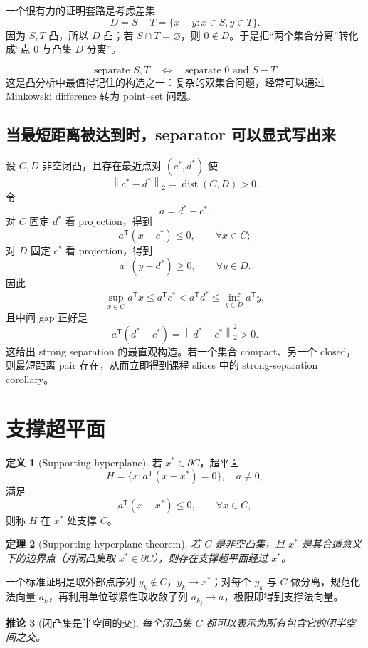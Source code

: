 \documentclass[11pt,a4paper,openany]{ctexrep}
\newtheorem{theorem}{定理}[chapter]
\newtheorem{corollary}[theorem]{推论}
\theoremstyle{definition}
\newtheorem{definition}[theorem]{定义}
\newcommand{\dist}{\operatorname{dist}}
\newcommand{\norm}[1]{\left\lVert #1\right\rVert}
\newcommand{\transpose}{\mathsf{T}}
\begin{document}
一个很有力的证明套路是考虑差集
\[
D=S-T=\{x-y:x\in S,y\in T\}.
\]
因为 $S,T$ 凸，所以 $D$ 凸；若 $S\cap T=\varnothing$，则 $0\notin D$。于是把“两个集合分离”转化成“点 $0$ 与凸集 $D$ 分离”。

\begin{keybox}[差集技巧]
\[
\boxed{\text{separate }S,T\quad\Longleftrightarrow\quad\text{separate }0\text{ and }S-T}
\]
这是凸分析中最值得记住的构造之一：复杂的双集合问题，经常可以通过 Minkowski difference 转为 point--set 问题。
\end{keybox}


\subsection{当最短距离被达到时，separator 可以显式写出来}
设 $C,D$ 非空闭凸，且存在最近点对 $(c^*,d^*)$ 使
\[
\norm{c^*-d^*}_2=\dist(C,D)>0.
\]
令
\[
a=d^*-c^*.
\]
对 $C$ 固定 $d^*$ 看 projection，得到
\[
a^\transpose(x-c^*)\le0,\qquad \forall x\in C;
\]
对 $D$ 固定 $c^*$ 看 projection，得到
\[
a^\transpose(y-d^*)\ge0,\qquad \forall y\in D.
\]
因此
\[
\sup_{x\in C}a^\transpose x\le a^\transpose c^*
< a^\transpose d^*\le \inf_{y\in D}a^\transpose y,
\]
且中间 gap 正好是
\[
a^\transpose(d^*-c^*)=\norm{d^*-c^*}_2^2>0.
\]
这给出 strong separation 的最直观构造。若一个集合 compact、另一个 closed，则最短距离 pair 存在，从而立即得到课程 slides 中的 strong-separation corollary。

\section{支撑超平面}

\begin{definition}[Supporting hyperplane]
若 $x^*\in\partial C$，超平面
\[
H=\{x:a^\transpose(x-x^*)=0\},\quad a\ne0,
\]
满足
\[
a^\transpose(x-x^*)\le0,\qquad\forall x\in C,
\]
则称 $H$ 在 $x^*$ 处支撑 $C$。
\end{definition}

\begin{theorem}[Supporting hyperplane theorem]
若 $C$ 是非空凸集，且 $x^*$ 是其合适意义下的边界点（对闭凸集取 $x^*\in\partial C$），则存在支撑超平面经过 $x^*$。
\end{theorem}

一个标准证明是取外部点序列 $y_k\notin C$，$y_k\to x^*$；对每个 $y_k$ 与 $C$ 做分离，规范化法向量 $a_k$，再利用单位球紧性取收敛子列 $a_{k_j}\to a$，极限即得到支撑法向量。

\begin{corollary}[闭凸集是半空间的交]
每个闭凸集 $C$ 都可以表示为所有包含它的闭半空间之交。
\end{corollary}
\end{document}
